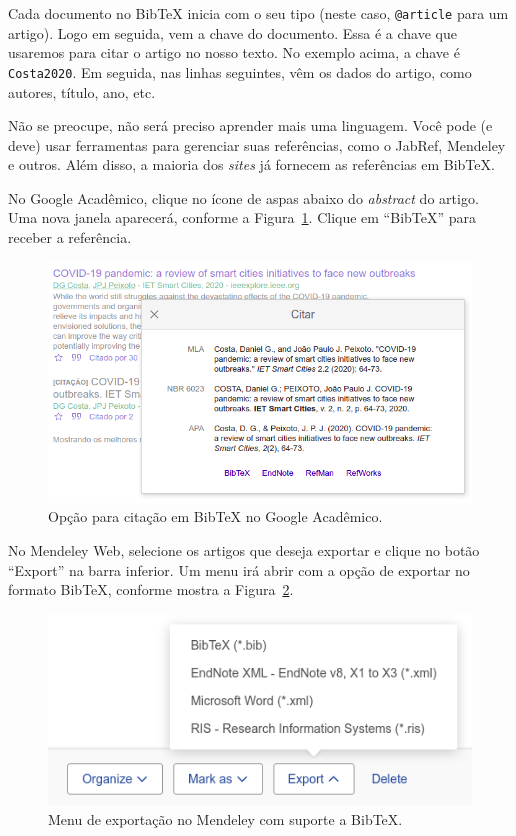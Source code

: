Cada documento no BibTeX inicia com o seu tipo (neste caso, \verb=@article= para um artigo). Logo em seguida, vem a chave do documento. Essa é a chave que usaremos para citar o artigo no nosso texto. No exemplo acima, a chave é \verb=Costa2020=. Em seguida, nas linhas seguintes, vêm os dados do artigo, como autores, título, ano, etc.

Não se preocupe, não será preciso aprender mais uma linguagem. Você pode (e deve) usar ferramentas para gerenciar suas referências, como o JabRef, Mendeley e outros. Além disso, a maioria dos \emph{sites} já fornecem as referências em BibTeX.

No Google Acadêmico, clique no ícone de aspas abaixo do \emph{abstract} do artigo. Uma nova janela aparecerá, conforme a Figura~\ref{fig:bibtex_google}. Clique em ``BibTeX'' para receber a referência.

\begin{figure}[h]
    \centering
    \includegraphics[scale=0.5]{Figures/bibtex_google.png}
    \caption{Opção para citação em BibTeX no Google Acadêmico.}
    \label{fig:bibtex_google}
\end{figure}

No Mendeley Web, selecione os artigos que deseja exportar e clique no botão ``Export'' na barra inferior. Um menu irá abrir com a opção de exportar no formato BibTeX, conforme mostra a Figura~\ref{fig:bibtex_mendeley}.

\begin{figure}[h]
    \centering
    \includegraphics[scale=0.5]{Figures/bibtex_mendeley.png}
    \caption{Menu de exportação no Mendeley com suporte a BibTeX.}
    \label{fig:bibtex_mendeley}
\end{figure}

